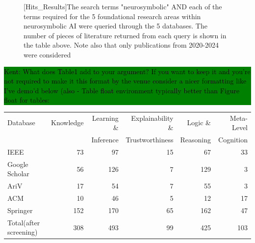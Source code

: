 \documentclass[hf]{ceurart}
\newcommand{\pinaforecomment}[4]{\colorbox{#1}{\textcolor{#4}{\parbox{.8\linewidth}{#2: #3}}}}
\newcommand{\osullikomment}[1]{\pinaforecomment{green}{Kent}{#1}{black}}
\begin{document}
\begin{figure}[ht]
    \centering

[Hits_Results]{The search terms "neurosymbolic" AND each of the terms required for the 5 foundational research areas within neurosymbolic AI were queried through the 5 databases. The number of pieces of literature returned from each query is shown in the table above. Note also that only publications from 2020-2024 were considered}
\label{tab::hits_2_results}
\end{figure}


    
\osullikomment{What does Table1 add to your argument? If you want to keep it and you're not required to make it this format by the venue consider a nicer formatting like I've demo'd below (also - Table float environment typically better than Figure float for tables:}

\begin{table}[ht]
    \centering
    \begin{tabular}{lrrrrr}
        Database & Knowledge & Learning \& & Explainability \& & Logic \& & Meta-Level \\
         &  & Inference & Trustworthiness & Reasoning & Cognition \\
        \hline
        IEEE & 73 & 97 & 15 & 67 & 33  \\
        Google Scholar & 56 & 126 & 7 & 129 & 3  \\
        Ar\textnormal{\raisebox{0.5ex}{$\chi$}}iV & 17 & 54 & 7 & 55 & 3  \\
        ACM & 10 & 46 & 5 & 12 & 17  \\
        Springer & 152 & 170 & 65 & 162 & 47  \\
        Total(after screening)   & 308 & 493 & 99 & 425 & 103  \\
     \end{tabular}
\end{table}
\end{document}
